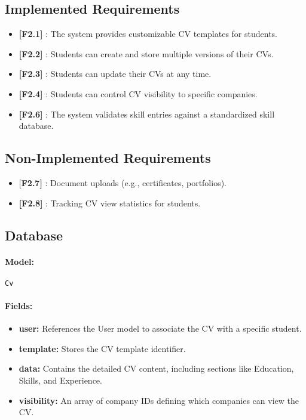 \subsection*{Implemented Requirements}
\begin{itemize}
    \item \textbf{[F2.1]} : The system provides customizable CV templates for students.
    \item \textbf{[F2.2]} : Students can create and store multiple versions of their CVs.
    \item \textbf{[F2.3]} : Students can update their CVs at any time.
    \item \textbf{[F2.4]} : Students can control CV visibility to specific companies.
    \item \textbf{[F2.6]} : The system validates skill entries against a standardized skill database.
\end{itemize}

\subsection*{Non-Implemented Requirements}
\begin{itemize}
    \item [\textbf{F2.7]} : Document uploads (e.g., certificates, portfolios).
    \item \textbf{[F2.8]} : Tracking CV view statistics for students.
\end{itemize}

\subsection*{Database}
\paragraph{Model:} \texttt{Cv}
\paragraph{Fields:}
\begin{itemize}
    \item \textbf{user:} References the User model to associate the CV with a specific student.
    \item \textbf{template:} Stores the CV template identifier.
    \item \textbf{data:} Contains the detailed CV content, including sections like Education, Skills, and Experience.
    \item \textbf{visibility:} An array of company IDs defining which companies can view the CV.
\end{itemize}

